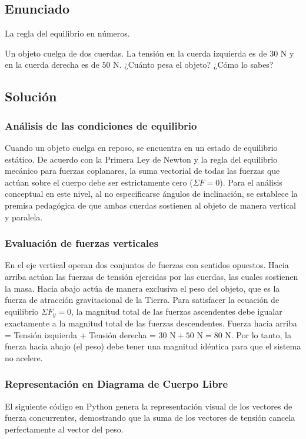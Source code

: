 \documentclass[12pt, a4paper]{article}
\begin{document}
\newpage

\subsection*{Enunciado}
La regla del equilibrio en números.

Un objeto cuelga de dos cuerdas. La tensión en la cuerda izquierda es de $30 \text{ N}$ y en la cuerda derecha es de $50 \text{ N}$. ¿Cuánto pesa el objeto? ¿Cómo lo sabes?

\subsection*{Solución}

\subsubsection*{Análisis de las condiciones de equilibrio}
Cuando un objeto cuelga en reposo, se encuentra en un estado de equilibrio estático. De acuerdo con la Primera Ley de Newton y la regla del equilibrio mecánico para fuerzas coplanares, la suma vectorial de todas las fuerzas que actúan sobre el cuerpo debe ser estrictamente cero ($\Sigma F = 0$). Para el análisis conceptual en este nivel, al no especificarse ángulos de inclinación, se establece la premisa pedagógica de que ambas cuerdas sostienen al objeto de manera vertical y paralela.

\subsubsection*{Evaluación de fuerzas verticales}
En el eje vertical operan dos conjuntos de fuerzas con sentidos opuestos. Hacia arriba actúan las fuerzas de tensión ejercidas por las cuerdas, las cuales sostienen la masa. Hacia abajo actúa de manera exclusiva el peso del objeto, que es la fuerza de atracción gravitacional de la Tierra.
Para satisfacer la ecuación de equilibrio $\Sigma F_y = 0$, la magnitud total de las fuerzas ascendentes debe igualar exactamente a la magnitud total de las fuerzas descendentes.
Fuerza hacia arriba = Tensión izquierda + Tensión derecha = $30 \text{ N} + 50 \text{ N} = 80 \text{ N}$.
Por lo tanto, la fuerza hacia abajo (el peso) debe tener una magnitud idéntica para que el sistema no acelere.

\subsubsection*{Representación en Diagrama de Cuerpo Libre}
El siguiente código en Python genera la representación visual de los vectores de fuerza concurrentes, demostrando que la suma de los vectores de tensión cancela perfectamente al vector del peso.
\end{document}
